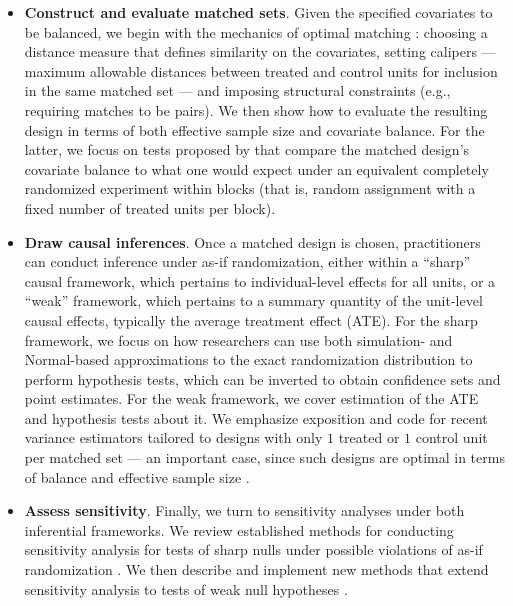 \documentclass[
  12pt,
  leqno]{article}
\begin{document}
\begin{itemize}
\item
  \textbf{Construct and evaluate matched sets}. Given the specified
  covariates to be balanced, we begin with the mechanics of optimal
  matching \citep{hansen2004, hansenklopfer2006}: choosing a distance
  measure that defines similarity on the covariates, setting calipers
  --- maximum allowable distances between treated and control units for
  inclusion in the same matched set --- and imposing structural
  constraints (e.g., requiring matches to be pairs). We then show how to
  evaluate the resulting design in terms of both effective sample size
  and covariate balance. For the latter, we focus on tests proposed by
  \citet{hansenbowers2008} that compare the matched design's covariate
  balance to what one would expect under an equivalent completely
  randomized experiment within blocks (that is, random assignment with a
  fixed number of treated units per block).
\item
  \textbf{Draw causal inferences}. Once a matched design is chosen,
  practitioners can conduct inference under as-if randomization, either
  within a ``sharp'' causal framework, which pertains to
  individual-level effects for all units, or a ``weak'' framework, which
  pertains to a summary quantity of the unit-level causal effects,
  typically the average treatment effect (ATE). For the sharp framework,
  we focus on how researchers can use both simulation- and Normal-based
  approximations to the exact randomization distribution to perform
  hypothesis tests, which can be inverted to obtain confidence sets and
  point estimates. For the weak framework, we cover estimation of the
  ATE and hypothesis tests about it. We emphasize exposition and code
  for recent variance estimators tailored to designs with only \(1\)
  treated or \(1\) control unit per matched set
  \citep{fogarty2018, pashleymiratrix2021} --- an important case, since
  such designs are optimal in terms of balance and effective sample size
  \citep{gurosenbaum1993, rosenbaum1991, hansen2004}.
\item
  \textbf{Assess sensitivity}. Finally, we turn to sensitivity analyses
  under both inferential frameworks. We review established methods for
  conducting sensitivity analysis for tests of sharp nulls under
  possible violations of as-if randomization
  \citep{rosenbaumkrieger1990, gastwirthetal2000, rosenbaum2018}. We
  then describe and implement new methods that extend sensitivity
  analysis to tests of weak null hypotheses \citep{fogarty2023}.
\end{itemize}
\end{document}
